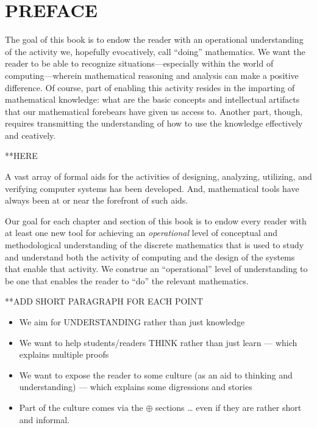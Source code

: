 
\chapter*{PREFACE}

The goal of this book is to endow the reader with an operational
understanding of the activity we, hopefully evocatively, call
``doing'' mathematics.  We want the reader to be able to recognize
situations---especially within the world of computing---wherein
mathematical reasoning and analysis can make a positive difference.
Of course, part of enabling this activity resides in the imparting of
mathematical knowledge: what are the basic concepts and intellectual
artifacts that our mathematical forebears have given us access to.
Another part, though, requires transmitting the understanding of how
to use the knowledge effectively and ceatively.

**HERE

  A vast array of formal aids for the activities of
designing, analyzing, utilizing, and verifying computer systems has
been developed.  And, mathematical tools have always been at or near
the forefront of such aids.

Our goal for each chapter and section of this book is to endow every
reader with at least one new tool for achieving an {\em operational} level
of conceptual and methodological understanding of the discrete
mathematics that is used to study and understand both the activity of
computing and the design of the systems that enable that activity.  We
construe an ``operational'' level of understanding to be one that
enables the reader to ``do'' the relevant mathematics.







**ADD SHORT PARAGRAPH FOR EACH POINT

\begin{itemize}
\item
We aim for UNDERSTANDING rather than just knowledge
\item
We want to help students/readers THINK rather than just learn —
which explains multiple proofs
\item
We want to expose the reader to some culture (as an aid to thinking
and understanding) — which explains some digressions and stories
\item
Part of the culture comes via the $\oplus$ sections … even if they are
rather short and informal.
\end{itemize}




